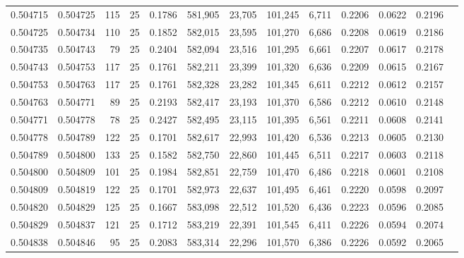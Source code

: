 \begin{tabular}{rrrrrrrrrrrrr}
0.504715 & 0.504725 & 115 &  25 &                                     0.1786 & 581,905 &  23,705 & 101,245 &   6,711 & 0.2206 & 0.0622 & 0.2196 \\
0.504725 & 0.504734 & 110 &  25 &                                     0.1852 & 582,015 &  23,595 & 101,270 &   6,686 & 0.2208 & 0.0619 & 0.2186 \\
0.504735 & 0.504743 &  79 &  25 &                                     0.2404 & 582,094 &  23,516 & 101,295 &   6,661 & 0.2207 & 0.0617 & 0.2178 \\
0.504743 & 0.504753 & 117 &  25 &                                     0.1761 & 582,211 &  23,399 & 101,320 &   6,636 & 0.2209 & 0.0615 & 0.2167 \\
0.504753 & 0.504763 & 117 &  25 &                                     0.1761 & 582,328 &  23,282 & 101,345 &   6,611 & 0.2212 & 0.0612 & 0.2157 \\
0.504763 & 0.504771 &  89 &  25 &                                     0.2193 & 582,417 &  23,193 & 101,370 &   6,586 & 0.2212 & 0.0610 & 0.2148 \\
0.504771 & 0.504778 &  78 &  25 &                                     0.2427 & 582,495 &  23,115 & 101,395 &   6,561 & 0.2211 & 0.0608 & 0.2141 \\
0.504778 & 0.504789 & 122 &  25 &                                     0.1701 & 582,617 &  22,993 & 101,420 &   6,536 & 0.2213 & 0.0605 & 0.2130 \\
0.504789 & 0.504800 & 133 &  25 &                                     0.1582 & 582,750 &  22,860 & 101,445 &   6,511 & 0.2217 & 0.0603 & 0.2118 \\
0.504800 & 0.504809 & 101 &  25 &                                     0.1984 & 582,851 &  22,759 & 101,470 &   6,486 & 0.2218 & 0.0601 & 0.2108 \\
0.504809 & 0.504819 & 122 &  25 &                                     0.1701 & 582,973 &  22,637 & 101,495 &   6,461 & 0.2220 & 0.0598 & 0.2097 \\
0.504820 & 0.504829 & 125 &  25 &                                     0.1667 & 583,098 &  22,512 & 101,520 &   6,436 & 0.2223 & 0.0596 & 0.2085 \\
0.504829 & 0.504837 & 121 &  25 &                                     0.1712 & 583,219 &  22,391 & 101,545 &   6,411 & 0.2226 & 0.0594 & 0.2074 \\
0.504838 & 0.504846 &  95 &  25 &                                     0.2083 & 583,314 &  22,296 & 101,570 &   6,386 & 0.2226 & 0.0592 & 0.2065 \\

\end{tabular}
